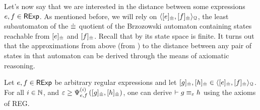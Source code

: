  Let's now say that we are interested in the distance between some expressions $e,f \in \mathsf{RExp}$. As mentioned before, we will rely on $\langle [e]_{{\mathrel{\dot\equiv}}},[f]_{{\mathrel{\dot\equiv}}} \rangle_{\mathcal{Q}}$, the least subautomaton of the ${\mathrel{\dot\equiv}}$ quotient of the Brzozowski automaton containing states reachable from $[e]_{{\mathrel{\dot\equiv}}}$ and $[f]_{{\mathrel{\dot\equiv}}}$. Recall that by  its state space is finite. It turns out that the approximations from above (from ) to the distance between any pair of states in that automaton can be derived through the means of axiomatic reasoning.
\begin{lemma}\label{c2:lem:provability1}
	Let $e,f \in \mathsf{RExp}$ be arbitrary regular expressions and let $[g]_{{\mathrel{\dot\equiv}}}, [h]_{{\mathrel{\dot\equiv}}} \in \langle [e]_{{\mathrel{\dot\equiv}}},[f]_{{\mathrel{\dot\equiv}}} \rangle_{\mathcal{Q}}$. 
       For all $i \in \mathbb{N}$, and $\varepsilon \geq {\Psi}_{e,f}^{(i)}\left([g]_{{\mathrel{\dot\equiv}}}, [h]_{{\mathrel{\dot\equiv}}}\right)$, one can derive $\vdash g \equiv_{\varepsilon} h$ using the axioms of \textsf{REG}.
\end{lemma}
